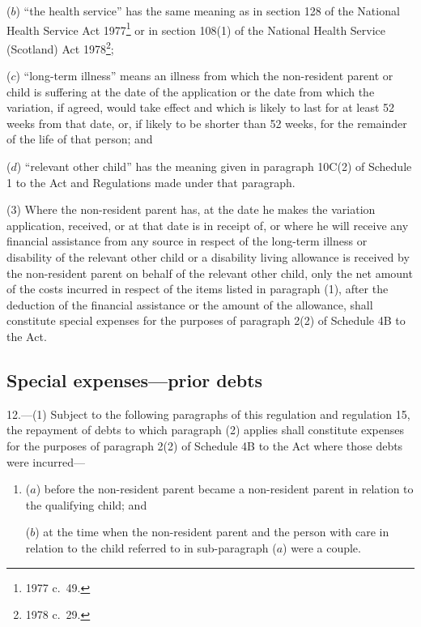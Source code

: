 \documentclass[12pt,a4paper]{article}
\begin{document}
\begin{enumerate}
($b$) “the health service” has the same meaning as in section 128 of the National Health Service Act 1977\footnote{1977 c.\ 49.} or in section 108(1) of the National Health Service (Scotland) Act 1978\footnote{1978 c.\ 29.};

($c$) “long-term illness” means an illness from which the non-resident parent or child is suffering at the date of the application or the date from which the variation, if agreed, would take effect and which is likely to last for at least 52 weeks from that date, or, if likely to be shorter than 52 weeks, for the remainder of the life of that person; and

($d$) “relevant other child” has the meaning given in paragraph 10C(2) of Schedule 1 to the Act and Regulations made under that paragraph.
\end{enumerate}

(3) Where the non-resident parent has, at the date he makes the variation application, received, or at that date is in receipt of, or where he will receive any financial assistance from any source in respect of the long-term illness or disability of the relevant other child or a disability living allowance is received by the non-resident parent on behalf of the relevant other child, only the net amount of the costs incurred in respect of the items listed in paragraph (1), after the deduction of the financial assistance or the amount of the allowance, shall constitute special expenses for the purposes of paragraph 2(2) of Schedule 4B to the Act.

\subsection[12. Special expenses—prior debts]{Special expenses—prior debts}

12.---(1)  Subject to the following paragraphs of this regulation and regulation 15, the repayment of debts to which paragraph (2) applies shall constitute expenses for the purposes of paragraph 2(2) of Schedule 4B to the Act where those debts were incurred—
\begin{enumerate}\item[]
($a$) before the non-resident parent became a non-resident parent in relation to the qualifying child; and

($b$) at the time when the non-resident parent and the person with care in relation to the child referred to in sub-paragraph ($a$)  were a couple.
\end{enumerate}
\end{document}
